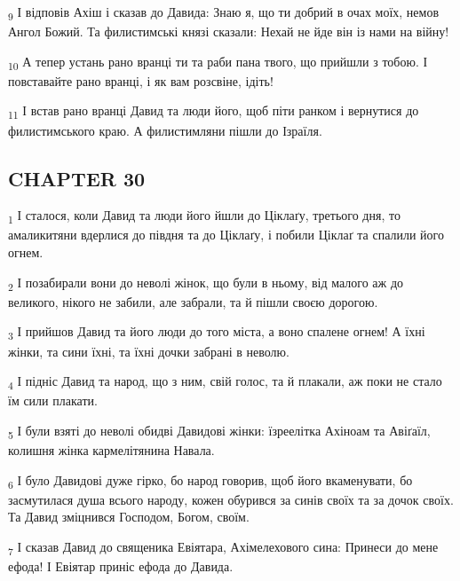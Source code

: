 \begin{tcolorbox}
\textsubscript{9} І відповів Ахіш і сказав до Давида: Знаю я, що ти добрий в очах моїх, немов Ангол Божий. Та филистимські князі сказали: Нехай не йде він із нами на війну!
\end{tcolorbox}
\begin{tcolorbox}
\textsubscript{10} А тепер устань рано вранці ти та раби пана твого, що прийшли з тобою. І повставайте рано вранці, і як вам розсвіне, ідіть!
\end{tcolorbox}
\begin{tcolorbox}
\textsubscript{11} І встав рано вранці Давид та люди його, щоб піти ранком і вернутися до филистимського краю. А филистимляни пішли до Ізраїля.
\end{tcolorbox}
\subsection{CHAPTER 30}
\begin{tcolorbox}
\textsubscript{1} І сталося, коли Давид та люди його йшли до Ціклаґу, третього дня, то амаликитяни вдерлися до півдня та до Ціклаґу, і побили Ціклаґ та спалили його огнем.
\end{tcolorbox}
\begin{tcolorbox}
\textsubscript{2} І позабирали вони до неволі жінок, що були в ньому, від малого аж до великого, нікого не забили, але забрали, та й пішли своєю дорогою.
\end{tcolorbox}
\begin{tcolorbox}
\textsubscript{3} І прийшов Давид та його люди до того міста, а воно спалене огнем! А їхні жінки, та сини їхні, та їхні дочки забрані в неволю.
\end{tcolorbox}
\begin{tcolorbox}
\textsubscript{4} І підніс Давид та народ, що з ним, свій голос, та й плакали, аж поки не стало їм сили плакати.
\end{tcolorbox}
\begin{tcolorbox}
\textsubscript{5} І були взяті до неволі обидві Давидові жінки: їзреелітка Ахіноам та Авіґаїл, колишня жінка кармелітянина Навала.
\end{tcolorbox}
\begin{tcolorbox}
\textsubscript{6} І було Давидові дуже гірко, бо народ говорив, щоб його вкаменувати, бо засмутилася душа всього народу, кожен обурився за синів своїх та за дочок своїх. Та Давид зміцнився Господом, Богом, своїм.
\end{tcolorbox}
\begin{tcolorbox}
\textsubscript{7} І сказав Давид до священика Евіятара, Ахімелехового сина: Принеси до мене ефода! І Евіятар приніс ефода до Давида.
\end{tcolorbox}
